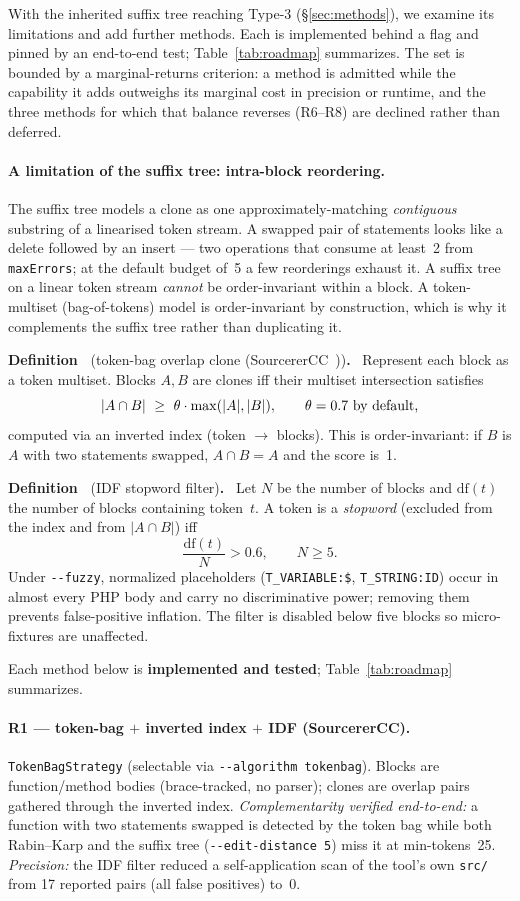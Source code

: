 \documentclass[10pt,a4paper]{article}
\newcounter{defn}[section]
\newcommand{\defn}[1]{\par\medskip\refstepcounter{defn}%
  \noindent\textbf{Definition~\thedefn} (#1)\textbf{.}\ }
\newcounter{lem}[section]
\begin{document}
With the inherited suffix tree reaching Type-3 (\S\ref{sec:methods}), we examine its limitations and
add further methods. Each is implemented behind a flag and pinned by an end-to-end test;
Table~\ref{tab:roadmap} summarizes. The set is bounded by a marginal-returns criterion: a method is
admitted while the capability it adds outweighs its marginal cost in precision or runtime, and the
three methods for which that balance reverses (R6--R8) are declined rather than deferred.

\paragraph{A limitation of the suffix tree: intra-block reordering.} The suffix tree models a clone as
one approximately-matching \emph{contiguous} substring of a linearised token stream. A swapped pair of
statements looks like a delete followed by an insert --- two operations that consume at least~2 from
\texttt{maxErrors}; at the default budget of~5 a few reorderings exhaust it. A suffix tree on a
linear token stream \emph{cannot} be order-invariant within a block. A token-multiset
(bag-of-tokens) model is order-invariant by construction, which is why it complements the suffix tree
rather than duplicating it.

\defn{token-bag overlap clone (SourcererCC~\cite{sourcerercc})}
Represent each block as a token multiset. Blocks $A,B$ are clones iff their multiset intersection
satisfies
\[
|A\cap B|\ \ge\ \theta\cdot\max(|A|,|B|),\qquad \theta=0.7\ \text{by default,}
\]
computed via an inverted index (token $\rightarrow$ blocks). This is order-invariant: if $B$ is $A$
with two statements swapped, $A\cap B=A$ and the score is~1.

\defn{IDF stopword filter}
Let $N$ be the number of blocks and $\mathrm{df}(t)$ the number of blocks containing token~$t$.
A token is a \emph{stopword} (excluded from the index and from $|A\cap B|$) iff
\[
\frac{\mathrm{df}(t)}{N} > 0.6,\qquad N\ge 5.
\]
Under \texttt{-{}-fuzzy}, normalized placeholders (\lstinline!T_VARIABLE:$!, \lstinline!T_STRING:ID!)
occur in almost every PHP body and carry no discriminative power; removing them prevents
false-positive inflation. The filter is disabled below five blocks so micro-fixtures are unaffected.

Each method below is \textbf{implemented and tested}; Table~\ref{tab:roadmap} summarizes.

\paragraph{R1 --- token-bag $+$ inverted index $+$ IDF (SourcererCC).}
\lstinline!TokenBagStrategy! (selectable via \texttt{-{}-algorithm tokenbag}). Blocks are
function/method bodies (brace-tracked, no parser); clones are overlap pairs gathered through the
inverted index. \emph{Complementarity verified end-to-end:} a function with two statements swapped is
detected by the token bag while both Rabin--Karp and the suffix tree (\texttt{-{}-edit-distance 5})
miss it at min-tokens~25. \emph{Precision:} the IDF filter reduced a self-application scan of the tool's own
\texttt{src/} from 17 reported pairs (all false positives) to~0.
\end{document}
